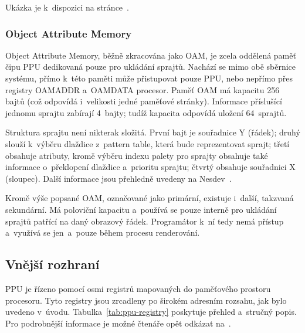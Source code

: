Ukázka je k~dispozici na stránce~\cite{Nesdev:attribute-table}.

\subsubsection{Object Attribute Memory}
\label{sec:ppu-oam}
Object Attribute Memory, běžně zkracována jako OAM, je zcela oddělená paměť čipu PPU dedikovaná pouze pro ukládání sprajtů. Nachází se mimo obě sběrnice systému, přímo k~této paměti může přistupovat pouze PPU, nebo nepřímo přes registry OAMADDR a~OAMDATA procesor. Paměť OAM má kapacitu 256 bajtů (což odpovídá i~velikosti jedné paměťové stránky). Informace příslušící jednomu sprajtu zabírají 4~bajty; tudíž kapacita odpovídá uložení 64~sprajtů.

Struktura sprajtu není nikterak složitá. První bajt je souřadnice Y (řádek); druhý slouží k~výběru dlaždice z~pattern table, která bude reprezentovat sprajt; třetí obsahuje atributy, kromě výběru indexu palety pro sprajty obsahuje také informace o~překlopení dlaždice a~prioritu sprajtu; čtvrtý obsahuje souřadnici X (sloupec). Další informace jsou přehledně uvedeny na Nesdev~\cite{Nesdev:oam}.

\begin{note}
	Kromě výše popsané OAM, označované jako primární, existuje i~další, takzvaná sekundární. Má poloviční kapacitu a~používá se pouze interně pro ukládání sprajtů patřící na daný obrazový řádek. Programátor k~ní tedy nemá přístup a~využívá se jen~a~pouze během procesu renderování.
\end{note}

\subsection{Vnější rozhraní}
\label{sec:ppu-cpu-io}
PPU je řízeno pomocí osmi registrů mapovaných do paměťového prostoru procesoru. Tyto registry jsou zrcadleny po širokém adresním rozsahu, jak bylo uvedeno v~úvodu. Tabulka~\ref{tab:ppu-registry} poskytuje přehled a~stručný popis. Pro podrobnější informace je možné čtenáře opět odkázat na~\cite{Nesdev:ppu-registers}.


